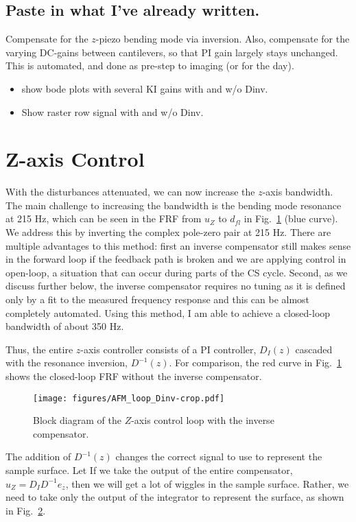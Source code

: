 \documentclass[11pt]{article}
\begin{document}
\subsection{Paste in what I've already written.}
Compensate for the $z$-piezo bending mode via inversion. Also, compensate for the varying DC-gains between cantilevers, so that PI gain largely stays unchanged. This is automated, and done as pre-step to imaging (or for the day).
  
  \begin{itemize}
  \item show bode plots with several KI gains with and w/o Dinv.
  \item Show raster row signal with and w/o Dinv.
  \end{itemize}


\section{Z-axis Control}
With the disturbances attenuated, we can now increase the $z$-axis bandwidth. The main challenge to increasing the bandwidth is the bending mode resonance at 215 Hz, which can be seen in the FRF from $u_Z$ to $d_{fl}$ in Fig.~\ref{fig:z_control} (blue curve). We address this by inverting the complex pole-zero pair at 215 Hz. There are multiple advantages to this method: first an inverse compensator still makes sense in the forward loop if the feedback path is broken and we are applying control in open-loop, a situation that can occur during parts of the CS cycle. Second, as we discuss further below, the inverse compensator requires no tuning as it is defined only by a fit to the measured frequency response and this can be almost completely automated. Using this method, I am able to achieve a closed-loop bandwidth of about 350 Hz.

\begin{figure}
  \centering
  
  \caption{}
  \label{fig:z_control}
\end{figure}
Thus, the entire $z$-axis controller consists of a PI controller, $D_I(z)$ cascaded with the resonance inversion, $D^{-1}(z)$. For comparison, the red curve in Fig.~\ref{fig:z_control} shows the closed-loop FRF without the inverse compensator.
\begin{figure}
  \centering
  \texttt{[image: figures/AFM\_loop\_Dinv-crop.pdf]}
  \caption{Block diagram of the $Z$-axis control loop with the inverse compensator.}
  \label{fig:afm_bd_dinv}
\end{figure}
The addition of $D^{-1}(z)$ changes the correct signal to use to represent the sample surface. Let 
If we take the output of the entire compensator, $u_Z=D_ID^{-1}e_z$, then we will get a lot of wiggles in the sample surface. Rather, we need to take only the output of the integrator to represent the surface, as shown in Fig.~\ref{fig:afm_bd_dinv}.
\end{document}
